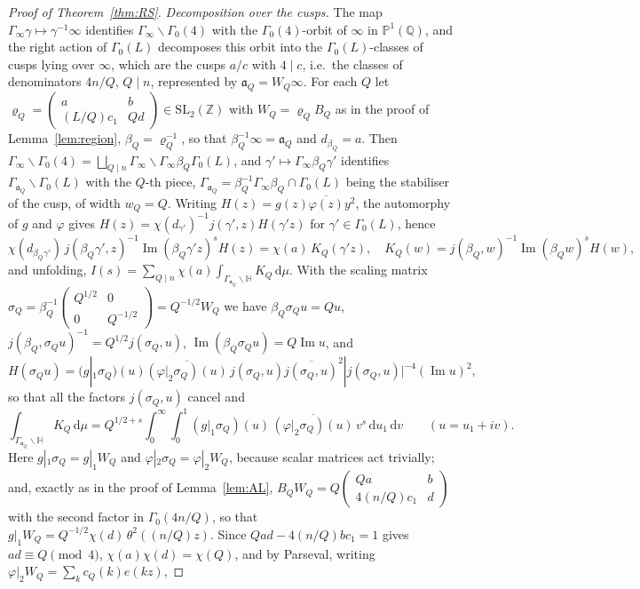 ﻿\documentclass[11pt]{amsart}
\theoremstyle{remark}
\newcommand{\Z}{\mathbb{Z}}
\newcommand{\HH}{\mathbb{H}}
\newcommand{\dd}{\mathrm{d}}
\begin{document}
\begin{proof}[Proof of Theorem~\ref{thm:RS}]
\emph{Decomposition over the cusps.} The map $\Gamma_\infty\gamma\mapsto\gamma^{-1}\infty$ identifies $\Gamma_\infty\backslash\Gamma_0(4)$ with the $\Gamma_0(4)$-orbit of $\infty$ in $\mathbb P^1(\mathbb Q)$, and the right action of $\Gamma_0(L)$ decomposes this orbit into the $\Gamma_0(L)$-classes of cusps lying over $\infty$, which are the cusps $a/c$ with $4\mid c$, i.e.\ the classes of denominators $4n/Q$, $Q\mid n$, represented by $\mathfrak a_Q=W_Q\infty$. For each $Q$ let $\varrho_Q=\left(\begin{smallmatrix}a&b\\(L/Q)c_1&Qd\end{smallmatrix}\right)\in\mathrm{SL}_2(\Z)$ with $W_Q=\varrho_QB_Q$ as in the proof of Lemma~\ref{lem:region}, $\beta_Q=\varrho_Q^{-1}$, so that $\beta_Q^{-1}\infty=\mathfrak a_Q$ and $d_{\beta_Q}=a$. Then $\Gamma_\infty\backslash\Gamma_0(4)=\bigsqcup_{Q\mid n}\Gamma_\infty\backslash\Gamma_\infty\beta_Q\Gamma_0(L)$, and $\gamma'\mapsto\Gamma_\infty\beta_Q\gamma'$ identifies $\Gamma_{\mathfrak a_Q}\backslash\Gamma_0(L)$ with the $Q$-th piece, $\Gamma_{\mathfrak a_Q}=\beta_Q^{-1}\Gamma_\infty\beta_Q\cap\Gamma_0(L)$ being the stabiliser of the cusp, of width $w_Q=Q$. Writing $H(z)=g(z)\overline{\varphi(z)}y^2$, the automorphy of $g$ and $\varphi$ gives $H(z)=\chi(d_{\gamma'})^{-1}j(\gamma',z)H(\gamma'z)$ for $\gamma'\in\Gamma_0(L)$, hence
\[
\chi(d_{\beta_Q\gamma'})\,j(\beta_Q\gamma',z)^{-1}\operatorname{Im}(\beta_Q\gamma'z)^sH(z)=\chi(a)\,K_Q(\gamma'z),\quad K_Q(w)=j(\beta_Q,w)^{-1}\operatorname{Im}(\beta_Qw)^sH(w),
\]
and unfolding, $I(s)=\sum_{Q\mid n}\chi(a)\int_{\Gamma_{\mathfrak a_Q}\backslash\HH}K_Q\,\dd\mu$. With the scaling matrix $\sigma_Q=\beta_Q^{-1}\left(\begin{smallmatrix}Q^{1/2}&0\\0&Q^{-1/2}\end{smallmatrix}\right)=Q^{-1/2}W_Q$ we have $\beta_Q\sigma_Qu=Qu$, $j(\beta_Q,\sigma_Qu)^{-1}=Q^{1/2}j(\sigma_Q,u)$, $\operatorname{Im}(\beta_Q\sigma_Qu)=Q\operatorname{Im}u$, and
\[
H(\sigma_Qu)=(g|_1\sigma_Q)(u)\overline{(\varphi|_2\sigma_Q)(u)}\,j(\sigma_Q,u)\overline{j(\sigma_Q,u)}^{2}|j(\sigma_Q,u)|^{-4}(\operatorname{Im}u)^2,
\]
so that all the factors $j(\sigma_Q,u)$ cancel and
\[
\int_{\Gamma_{\mathfrak a_Q}\backslash\HH}K_Q\,\dd\mu=Q^{1/2+s}\int_0^\infty\!\!\int_0^1(g|_1\sigma_Q)(u)\,\overline{(\varphi|_2\sigma_Q)(u)}\,v^{s}\,\dd u_1\,\dd v\qquad(u=u_1+iv).
\]
Here $g|_1\sigma_Q=g|_1W_Q$ and $\varphi|_2\sigma_Q=\varphi|_2W_Q$, because scalar matrices act trivially; and, exactly as in the proof of Lemma~\ref{lem:AL}, $B_QW_Q=Q\left(\begin{smallmatrix}Qa&b\\4(n/Q)c_1&d\end{smallmatrix}\right)$ with the second factor in $\Gamma_0(4n/Q)$, so that $g|_1W_Q=Q^{-1/2}\chi(d)\,\theta^2((n/Q)z)$. Since $Qad-4(n/Q)bc_1=1$ gives $ad\equiv Q\pmod 4$, $\chi(a)\chi(d)=\chi(Q)$, and by Parseval, writing $\varphi|_2W_Q=\sum_kc_Q(k)e(kz)$,

\end{proof}
\end{document}
